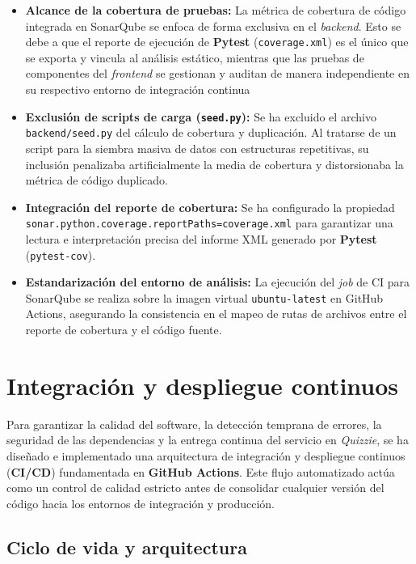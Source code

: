 \begin{itemize}
    \item \textbf{Alcance de la cobertura de pruebas:} La métrica de cobertura de código integrada en SonarQube se enfoca de forma exclusiva en el \textit{backend}. Esto se debe a que el reporte de ejecución de \textbf{Pytest} (\texttt{coverage.xml}) es el único que se exporta y vincula al análisis estático, mientras que las pruebas de componentes del \textit{frontend} se gestionan y auditan de manera independiente en su respectivo entorno de integración continua
    \item \textbf{Exclusión de scripts de carga (\texttt{seed.py}):} Se ha excluido el archivo \texttt{backend/seed.py} del cálculo de cobertura y duplicación. Al tratarse de un script para la siembra masiva de datos con estructuras repetitivas, su inclusión penalizaba artificialmente la media de cobertura y distorsionaba la métrica de código duplicado.
    \item \textbf{Integración del reporte de cobertura:} Se ha configurado la propiedad \texttt{sonar.python.coverage.reportPaths=coverage.xml} para garantizar una lectura e interpretación precisa del informe XML generado por \textbf{Pytest} (\texttt{pytest-cov}).
    \item \textbf{Estandarización del entorno de análisis:} La ejecución del \textit{job} de CI para SonarQube se realiza sobre la imagen virtual \texttt{ubuntu-latest} en GitHub Actions, asegurando la consistencia en el mapeo de rutas de archivos entre el reporte de cobertura y el código fuente.
\end{itemize}

\section{Integración y despliegue continuos}\label{sec:cicd}

Para garantizar la calidad del software, la detección temprana de errores, la seguridad de las dependencias y la entrega continua del servicio en \textit{Quizzie}, se ha diseñado e implementado una arquitectura de integración y despliegue continuos (\textbf{CI/CD}) fundamentada en \textbf{GitHub Actions}. Este flujo automatizado actúa como un control de calidad estricto antes de consolidar cualquier versión del código hacia los entornos de integración y producción.

\subsection{Ciclo de vida y arquitectura}\label{subsec:cicd_arquitectura}

